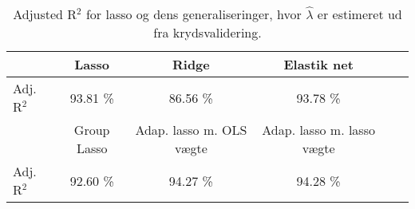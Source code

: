 \begin{table}[ht]
\center
\begin{tabular}{lccccc}
\toprule
& Lasso & Ridge & Elastik net \\ \midrule
Adj. R$^2$ & 93.81 \%  & 86.56 \% & 93.78 \%  \\ \bottomrule \toprule 
& Group Lasso & Adap. lasso m. OLS vægte & Adap. lasso m. lasso vægte \\ \midrule
Adj. R$^2$ & 92.60 \% & 94.27 \%  & 94.28 \% \\ \bottomrule 
 \end{tabular}
\caption{Adjusted R$^2$ for lasso og dens generaliseringer, hvor $\widehat{\lambda}$ er estimeret ud fra krydsvalidering.} \label{tab:adj_r2_shrinkage_tab}
\end{table}